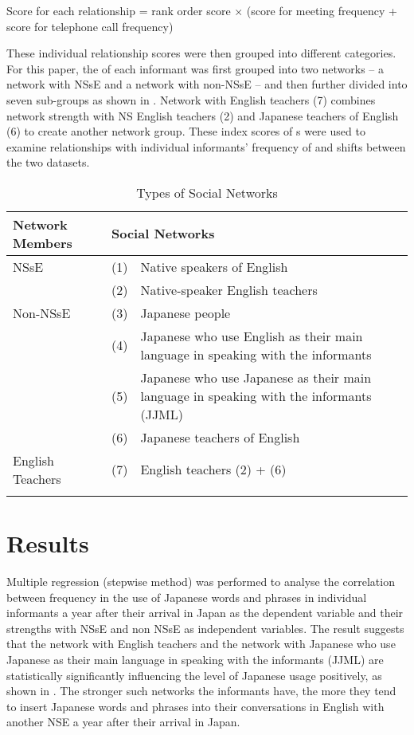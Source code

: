 \documentclass[output=paper]{LSP/langsci}
\begin{document}
Score for each relationship =   rank order score × (score for meeting frequency + score for             telephone call frequency)

These individual relationship scores were then grouped into different  categories. For this paper, the  of each informant was first grouped into two networks -- a network with NSsE and a network with non-NSsE -- and then further divided into seven sub-groups as shown in . Network with English teachers (7) combines network strength with NS English teachers (2) and Japanese teachers of English (6) to create another network group. These index scores of s were used to examine relationships with individual informants’ frequency of  and shifts between the two datasets.

\begin{table}
\begin{tabular}{lll}
\lsptoprule
Network Members & \multicolumn{2}{l}{Social Networks}\\
\midrule
NSsE & (1) & Native speakers of English\\
& (2) & Native-speaker English teachers\\
Non-NSsE & (3) & Japanese people\\
& (4) & \begin{minipage}[t]{0.6\textwidth}Japanese who use English as their main language in speaking with the informants\end{minipage}   \\
& (5) & \begin{minipage}[t]{0.6\textwidth}Japanese who use Japanese as their main language in speaking with the informants (JJML)\end{minipage}\\
& (6) & Japanese teachers of English\\
English Teachers & (7) & English teachers (2) + (6)\\
\lspbottomrule
\end{tabular}
\caption{Types of Social Networks}
\label{tab:hirano:1}
\end{table}

\section{Results}
Multiple regression (stepwise method) was performed to analyse the correlation between frequency in the use of Japanese words and phrases in individual informants a year after their arrival in Japan as the dependent variable and their  strengths with NSsE and non NSsE as independent variables. The result suggests that the network with English teachers and the network with Japanese who use Japanese as their main language in speaking with the informants (JJML) are statistically significantly influencing the level of Japanese usage positively, as shown in . The stronger such networks the informants have, the more they tend to insert Japanese words and phrases into their conversations in English with another NSE a year after their arrival in Japan. 
\end{document}

